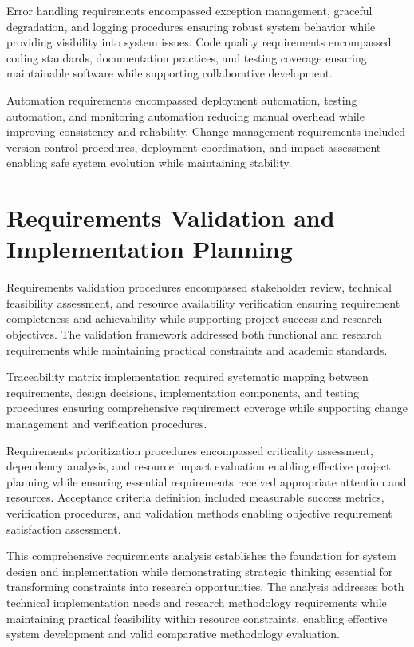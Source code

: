 Error handling requirements encompassed exception management, graceful degradation, and logging procedures ensuring robust system behavior while providing visibility into system issues. Code quality requirements encompassed coding standards, documentation practices, and testing coverage ensuring maintainable software while supporting collaborative development.

Automation requirements encompassed deployment automation, testing automation, and monitoring automation reducing manual overhead while improving consistency and reliability. Change management requirements included version control procedures, deployment coordination, and impact assessment enabling safe system evolution while maintaining stability.

\section{Requirements Validation and Implementation Planning}

Requirements validation procedures encompassed stakeholder review, technical feasibility assessment, and resource availability verification ensuring requirement completeness and achievability while supporting project success and research objectives. The validation framework addressed both functional and research requirements while maintaining practical constraints and academic standards.

Traceability matrix implementation required systematic mapping between requirements, design decisions, implementation components, and testing procedures ensuring comprehensive requirement coverage while supporting change management and verification procedures.


Requirements prioritization procedures encompassed criticality assessment, dependency analysis, and resource impact evaluation enabling effective project planning while ensuring essential requirements received appropriate attention and resources. Acceptance criteria definition included measurable success metrics, verification procedures, and validation methods enabling objective requirement satisfaction assessment.

This comprehensive requirements analysis establishes the foundation for system design and implementation while demonstrating strategic thinking essential for transforming constraints into research opportunities. The analysis addresses both technical implementation needs and research methodology requirements while maintaining practical feasibility within resource constraints, enabling effective system development and valid comparative methodology evaluation.